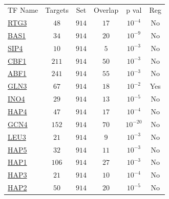 \begin{table}[h!]
\centering 
{}
\begin{tabular}{l c c c c c}
\hline

TF Name &	Targets &	Set &	Overlap &	p val &	Reg \\ 
\href{www.yeastgenome.org/cgi-bin/locus.fpl?locus=RTG3}{RTG3} &	 $48$ &	$914$&	$17$ &	$10^{-4}$ & 	 No \\ 
\href{www.yeastgenome.org/cgi-bin/locus.fpl?locus=BAS1}{BAS1} &	 $34$ &	$914$&	$20$ &	$10^{-9}$ & 	 No \\ 
\href{www.yeastgenome.org/cgi-bin/locus.fpl?locus=SIP4}{SIP4} &	 $10$ &	$914$&	$5$ &	$10^{-3}$ & 	 No \\ 
\href{www.yeastgenome.org/cgi-bin/locus.fpl?locus=CBF1}{CBF1} &	 $211$ &	$914$&	$50$ &	$10^{-3}$ & 	 No \\ 
\href{www.yeastgenome.org/cgi-bin/locus.fpl?locus=ABF1}{ABF1} &	 $241$ &	$914$&	$55$ &	$10^{-3}$ & 	 No \\ 
\href{www.yeastgenome.org/cgi-bin/locus.fpl?locus=GLN3}{GLN3} &	 $67$ &	$914$&	$18$ &	$10^{-2}$ & 	 Yes \\ 
\href{www.yeastgenome.org/cgi-bin/locus.fpl?locus=INO4}{INO4} &	 $29$ &	$914$&	$13$ &	$10^{-5}$ & 	 No \\ 
\href{www.yeastgenome.org/cgi-bin/locus.fpl?locus=HAP4}{HAP4} &	 $47$ &	$914$&	$17$ &	$10^{-4}$ & 	 No \\ 
\href{www.yeastgenome.org/cgi-bin/locus.fpl?locus=GCN4}{GCN4} &	 $152$ &	$914$&	$70$ &	$10^{-20}$ & 	 No \\ 
\href{www.yeastgenome.org/cgi-bin/locus.fpl?locus=LEU3}{LEU3} &	 $21$ &	$914$&	$9$ &	$10^{-3}$ & 	 No \\ 
\href{www.yeastgenome.org/cgi-bin/locus.fpl?locus=HAP5}{HAP5} &	 $32$ &	$914$&	$11$ &	$10^{-3}$ & 	 No \\ 
\href{www.yeastgenome.org/cgi-bin/locus.fpl?locus=HAP1}{HAP1} &	 $106$ &	$914$&	$27$ &	$10^{-3}$ & 	 No \\ 
\href{www.yeastgenome.org/cgi-bin/locus.fpl?locus=HAP3}{HAP3} &	 $21$ &	$914$&	$10$ &	$10^{-4}$ & 	 No \\ 
\href{www.yeastgenome.org/cgi-bin/locus.fpl?locus=HAP2}{HAP2} &	 $50$ &	$914$&	$20$ &	$10^{-5}$ & 	 No \\ 
\hline
\end{tabular} 
\caption[]{}
\label{}
\end{table} 


